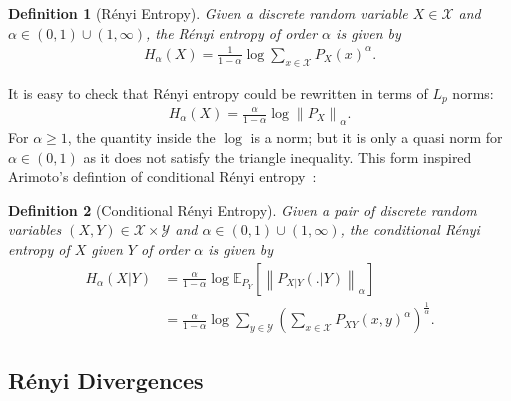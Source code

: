 \documentclass{article}
\numberwithin{theorem}{section}
\numberwithin{example}{section}
\numberwithin{remark}{section}
\newtheorem{definition}{Definition}
\numberwithin{definition}{section}
\newcommand{\E}{\mathbb{E}}
\newcommand{\X}{\mathcal{X}}
\newcommand{\Y}{\mathcal{Y}}
\newcommand{\range}{(0,1) \cup (1,\infty)}
\newcommand{\revised}[1]{{\color{black} #1}}
\begin{document}
\begin{definition}[R\'enyi Entropy] \label{def:renyi-entropy}
    Given a discrete random variable $X \in \X$ and $\alpha \in \range$, the R\'enyi entropy of order $\alpha$ is given by
    \begin{align}
        \label{eq:def-renyi-entropy}
        H_\alpha(X) = \frac{1}{1-\alpha} \log \sum_{x \in \X} P_X(x)^\alpha.
    \end{align}
\end{definition}
It is easy to check that R\'enyi entropy could be rewritten in terms of $L_p$ norms:
\begin{align}
    \label{eq:renyi-entropy-norms}
    H_\alpha (X) = \frac{\alpha}{1-\alpha} \log \left\| P_X \right\|_\alpha.
  \end{align}  
For $\alpha \geq 1$, the quantity inside the $\log$ is a norm; but it is only a quasi norm for \revised{$\alpha \in (0,1)$} as it does not satisfy the triangle inequality. This form inspired Arimoto's defintion of conditional R\'enyi entropy~\cite{arimoto:77}:

\begin{definition}[Conditional R\'enyi Entropy] \label{def:cond-renyi}
    Given a pair of discrete random variables $(X,Y) \in \X \times \Y$ and $\alpha \in \range$, the conditional R\'enyi entropy of $X$ given $Y$ of order $\alpha$ is given by 
    \begin{align}
        \label{eq:def-cond-renyi}
        H_\alpha(X | Y) & = \frac{\alpha}{1-\alpha} \log \E_{P_Y} \left[  \left\| P_{X|Y}(.|Y) \right\|_\alpha \right] \\
        & = \frac{\alpha}{1-\alpha} \log \sum_{y \in \Y} \left( \sum_{x \in \X} P_{XY}(x,y)^\alpha \right)^{\frac{1}{\alpha}}.
    \end{align}
\end{definition}


\subsection{R\'enyi Divergences} \label{sec:renyi-divergence}
\end{document}
